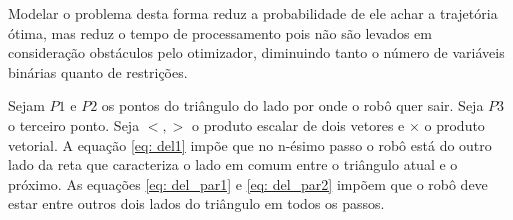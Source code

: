 \documentclass[a4paper,12pt]{article}
\begin{document}


Modelar o problema desta forma reduz a probabilidade de ele achar a trajetória ótima, mas reduz o tempo de processamento pois não são levados em consideração obstáculos pelo otimizador, diminuindo tanto o número de variáveis binárias quanto de restrições.

Sejam $P1$ e $P2$ os pontos do triângulo do lado por onde o robô quer sair. Seja $P3$ o terceiro ponto. Seja $<,>$ o produto escalar de dois vetores e $\times$ o produto vetorial. A equação \ref{eq: del1} impõe que no n-ésimo passo o robô está do outro lado da reta que caracteriza o lado em comum entre o triângulo atual e o próximo. As equações \ref{eq: del_par1} e \ref{eq: del_par2} impõem que o robô deve estar entre outros dois lados do triângulo em todos os passos.
\end{document}
